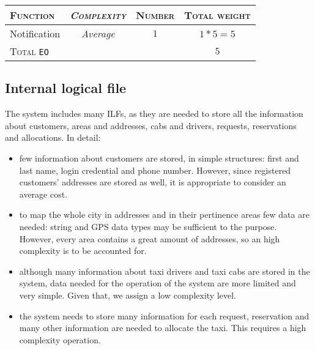 \begin{table*}\begin{tabularx}{\textwidth}{ X >{\itshape}C{\myWFP} C{\myWFP} C{\myWFP} }

\toprule
	
	\normalfont\textsc{Function} &
	\normalfont\textsc{Complexity}	& 
	\normalfont\textsc{Number} &
	\normalfont\textsc{Total weight} \\

\toprule

	Notification	& Average		& $ 1 $		& $ 1*5 = 5 $ \\

\bottomrule

\normalfont\textsc{Total} \texttt{EO} && & $ 5 $ \\
\bottomrule


\end{tabularx}\end{table*}



\subsection*{Internal logical file}



The system includes many ILFs, as they are needed to store all the information about customers, areas and addresses, cabs and drivers, requests, reservations and allocations. In detail:

\begin{itemize}
	\item few information about customers are stored, in simple structures: first and last name, login credential and phone number. However, since registered customers' addresses are stored as well, it is appropriate to consider an average cost.
	\item to map the whole city in addresses and in their pertinence areas few data are needed: string and GPS data types may be sufficient to the purpose. However, every area contains a great amount of addresses, so an high complexity is to be accounted for.
	\item although many information about taxi drivers and taxi cabs are stored in the system, data needed for the operation of the system are more limited and very simple. Given that, we assign a low complexity level.
	\item the system needs to store many information for each request, reservation and many other information are needed to allocate the taxi. This requires a high complexity operation.
\end{itemize}






